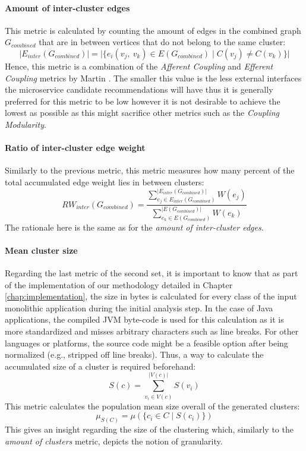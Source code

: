 \documentclass[12pt,a4paper]{report}
\begin{document}
\paragraph{Amount of inter-cluster edges}
This metric is calculated by counting
the amount of edges in the combined graph \(G_{combined}\) that are in between
vertices that do not belong to the same cluster:
\[
  \vert E_{inter}(G_{combined}) \vert =
  \vert \{ e_i(v_j, \ v_k) \in E(G_{combined}) \mid C(v_j) \neq C(v_k) \} \vert
\]
Hence, this metric is a combination of the \textit{Afferent Coupling}
and \textit{Efferent Coupling} metrics by Martin \cite{martin2000design}.
The smaller this value is the less external interfaces the
microservice candidate recommendations will have thus it is generally preferred
for this metric to be low however it is not desirable to achieve the lowest as
possible as this might sacrifice other metrics such as the \textit{Coupling
Modularity}.

\paragraph{Ratio of inter-cluster edge weight}
Similarly to the previous
metric, this metric measures how many percent of the total accumulated edge
weight lies in between clusters:
\[
  RW_{inter}(G_{combined}) =
  \frac{
    \sum_{e_j \in E_{inter}(G_{combined})}^{\vert E_{inter}(G_{combined}) \vert} W(e_j)
  }{
    \sum_{e_k \in E(G_{combined})}^{\vert E(G_{combined}) \vert} W(e_k)
  }
\]
The rationale here is the same as for the \textit{amount of inter-cluster edges}.

\paragraph{Mean cluster size}
Regarding the last metric of the second set, it
is important to know that as part of the implementation of our methodology
detailed in Chapter \ref{chap:implementation}, the size in bytes is calculated
for every class of the input monolithic application during the initial analysis
step. In the case of Java applications, the compiled JVM byte-code is used for
this calculation as it is more standardized and misses arbitrary characters
such as line breaks. For other languages or platforms, the source code might be
a feasible option after being normalized (e.g., stripped off line breaks).
Thus, a way to calculate the accumulated size of a cluster is required
beforehand:
\[
  S(c) = \sum_{v_i \in V(c)}^{\vert V(c) \vert} S(v_i)
\]
This metric calculates the population mean size overall of
the generated clusters:
\[
  \mu_{S(C)} = \mu(\{ c_i \in C \mid S(c_i) \})
\]
This gives an insight regarding the size of the clustering which, similarly to the
\textit{amount of clusters} metric, depicts the notion of granularity.
\end{document}
